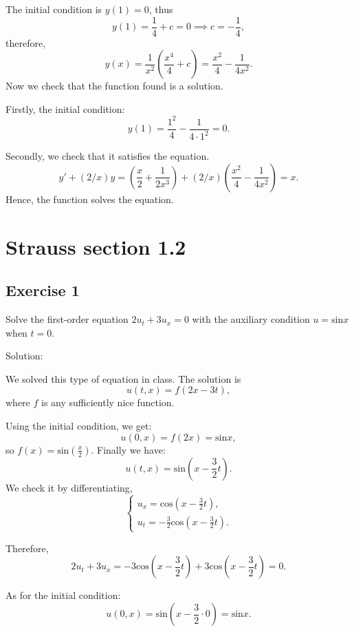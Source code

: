 \documentclass{article}
\renewcommand{\thesubsection}{\thesection.\alph{subsection}} %
\begin{document}
		The initial condition is $y(1)=0$, thus \[ y(1)=\frac{1}{4} + c= 0 \implies c=-\frac{1}{4},\]
		therefore,
		\[y(x) = \frac{1}{x^2}\left(\frac{x^4}{4}+c\right) = \frac{x^2}{4} - \frac{1}{4x^2}.\]
		Now we check that the function found is a solution.

		Firstly, the initial condition:
		\[y(1)= \frac{1^2}{4} - \frac{1}{4\cdot 1^2} =0.\]

		Secondly, we check that it satisfies the equation.
		\[y'+(2/x)y = \left(\frac{x}{2} + \frac{1}{2x^3}\right) +(2/x)\left(\frac{x^2}{4} - \frac{1}{4x^2}\right) = x.\]
		Hence, the function solves the equation.

\section{Strauss section 1.2}
\subsection{Exercise 1}
			Solve the first-order equation
			$2u_t +3u_ x =0$ with the auxiliary condition $u=\text{sin}x$ when $t=0.$

			Solution:

			We solved this type of equation in class.
			The solution is 
			\[ u(t,x)=f(2x-3t),\]
			where $f$ is any sufficiently nice function.

			Using the initial condition, we get:
			\[u(0,x)=f(2x)=\text{sin}x,\]
			so $f(x)=\text{sin}\left(\frac{x}{2}\right)$.
			Finally we have:
			\[u(t,x)=\text{sin}\left(x-\frac{3}{2}t\right).\]
			We check it by differentiating,
			\begin{equation*}
				\begin{cases}
					u_x=\text{cos}\left(x-\frac{3}{2}t\right),
					\\
					u_t=-\frac{3}{2}\text{cos}\left(x-\frac{3}{2}t\right).
				\end{cases}
			\end{equation*}

			Therefore,
			\[ 2u_t +3u_x=-3\text{cos}\left(x-\frac{3}{2}t\right) + 3\text{cos}\left(x-\frac{3}{2}t\right)=0.\]

			As for the initial condition:
			\[u(0,x)=\text{sin}\left(x-\frac{3}{2}\cdot0\right)=\text{sin}x.\]
\end{document}
